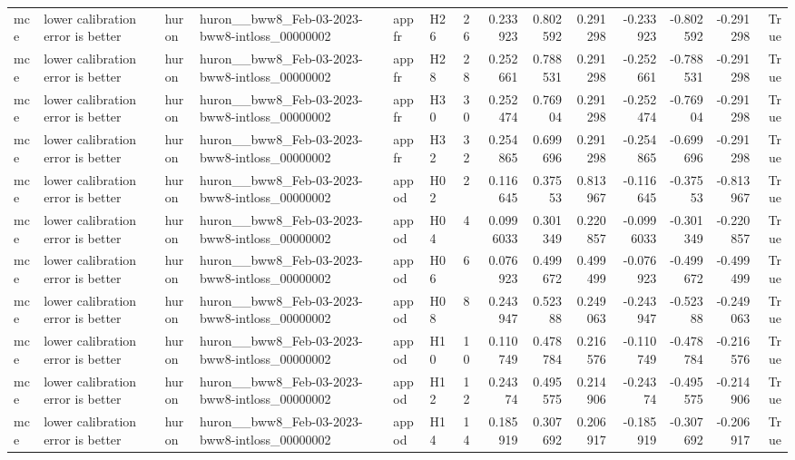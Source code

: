 \begin{longtable}{llllllrrrrrrrr}
mce & lower calibration error is better & huron & huron\_\_bww8\_Feb-03-2023-bww8-intloss\_00000002 & appfr & H26 & 26 & 0.233923 & 0.802592 & 0.291298 & -0.233923 & -0.802592 & -0.291298 & True \\
mce & lower calibration error is better & huron & huron\_\_bww8\_Feb-03-2023-bww8-intloss\_00000002 & appfr & H28 & 28 & 0.252661 & 0.788531 & 0.291298 & -0.252661 & -0.788531 & -0.291298 & True \\
mce & lower calibration error is better & huron & huron\_\_bww8\_Feb-03-2023-bww8-intloss\_00000002 & appfr & H30 & 30 & 0.252474 & 0.76904 & 0.291298 & -0.252474 & -0.76904 & -0.291298 & True \\
mce & lower calibration error is better & huron & huron\_\_bww8\_Feb-03-2023-bww8-intloss\_00000002 & appfr & H32 & 32 & 0.254865 & 0.699696 & 0.291298 & -0.254865 & -0.699696 & -0.291298 & True \\
mce & lower calibration error is better & huron & huron\_\_bww8\_Feb-03-2023-bww8-intloss\_00000002 & appod & H02 & 2 & 0.116645 & 0.37553 & 0.813967 & -0.116645 & -0.37553 & -0.813967 & True \\
mce & lower calibration error is better & huron & huron\_\_bww8\_Feb-03-2023-bww8-intloss\_00000002 & appod & H04 & 4 & 0.0996033 & 0.301349 & 0.220857 & -0.0996033 & -0.301349 & -0.220857 & True \\
mce & lower calibration error is better & huron & huron\_\_bww8\_Feb-03-2023-bww8-intloss\_00000002 & appod & H06 & 6 & 0.076923 & 0.499672 & 0.499499 & -0.076923 & -0.499672 & -0.499499 & True \\
mce & lower calibration error is better & huron & huron\_\_bww8\_Feb-03-2023-bww8-intloss\_00000002 & appod & H08 & 8 & 0.243947 & 0.52388 & 0.249063 & -0.243947 & -0.52388 & -0.249063 & True \\
mce & lower calibration error is better & huron & huron\_\_bww8\_Feb-03-2023-bww8-intloss\_00000002 & appod & H10 & 10 & 0.110749 & 0.478784 & 0.216576 & -0.110749 & -0.478784 & -0.216576 & True \\
mce & lower calibration error is better & huron & huron\_\_bww8\_Feb-03-2023-bww8-intloss\_00000002 & appod & H12 & 12 & 0.24374 & 0.495575 & 0.214906 & -0.24374 & -0.495575 & -0.214906 & True \\
mce & lower calibration error is better & huron & huron\_\_bww8\_Feb-03-2023-bww8-intloss\_00000002 & appod & H14 & 14 & 0.185919 & 0.307692 & 0.206917 & -0.185919 & -0.307692 & -0.206917 & True \\

\end{longtable}
